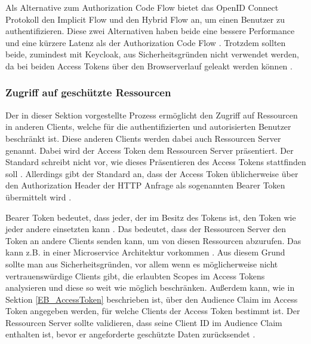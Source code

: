 Als Alternative zum Authorization Code Flow bietet das OpenID Connect Protokoll den Implicit Flow und den Hybrid Flow an, um einen Benutzer zu authentifizieren. Diese zwei Alternativen haben beide eine bessere Performance \cite{EB26} und eine kürzere Latenz als der Authorization Code Flow \cite{EB25}. Trotzdem sollten beide, zumindest mit Keycloak, aus Sicherheitsgründen nicht verwendet werden, da bei beiden Access Tokens über den Browserverlauf geleakt werden können \cite{EB26} \cite{EB23}.



\subsubsection{Zugriff auf geschützte Ressourcen} \label{EB_Zugriff auf geschützte Ressourcen}

Der in dieser Sektion vorgestellte Prozess ermöglicht den Zugriff auf Ressourcen in anderen Clients, welche für die authentifizierten und autorisierten Benutzer beschränkt ist. Diese anderen Clients werden dabei auch Ressourcen Server genannt. Dabei wird der Access Token dem Ressourcen Server präsentiert. Der Standard schreibt nicht vor, wie dieses Präsentieren des Access Tokens stattfinden soll \cite{EB28}. Allerdings gibt der Standard an, dass der Access Token üblicherweise über den Authorization Header der HTTP Anfrage als sogenannten Bearer Token übermittelt wird \cite{EB28}. 

Bearer Token bedeutet, dass jeder, der im Besitz des Tokens ist, den Token wie jeder andere einsetzten kann \cite{EB29}. Das bedeutet, dass der Ressourcen Server den Token an andere Clients senden kann, um von diesen Ressourcen abzurufen. Das kann z.B. in einer Microservice Architektur vorkommen \cite{EB31}. Aus diesem Grund sollte man aus Sicherheitsgründen, vor allem wenn es möglicherweise nicht vertrauenswürdige Clients gibt, die erlaubten Scopes im Access Tokens analysieren und diese so weit wie möglich beschränken. Außerdem kann, wie in Sektion \ref{EB_AccessToken} beschrieben ist, über den Audience Claim im Access Token angegeben werden, für welche Clients der Access Token bestimmt ist. Der Ressourcen Server sollte validieren, dass seine Client ID im Audience Claim enthalten ist, bevor er angeforderte geschützte Daten zurücksendet \cite{EB30}.

